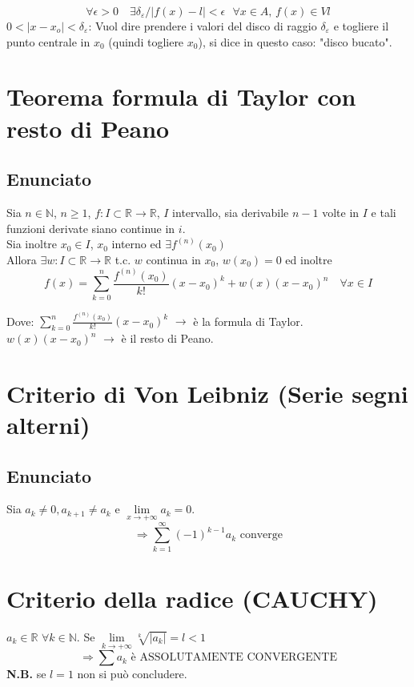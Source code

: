 \documentclass{article}
\newcommand{\R}{\mathbb{R}}
\newcommand{\N}{\mathbb{N}}
\newcommand{\DeltaEp}{\delta_{\varepsilon}} %
\newcommand{\hSpace}{\hspace{1em}}
\begin{document}
\begin{flushleft}
\[
\forall \epsilon > 0 \hSpace \exists \DeltaEp / \left|f(x)-l\right| < \epsilon \text{ } \forall x \in A \text{, } f(x) \in Vl
\]
$0 < \left|x - x_o\right| < \DeltaEp$: Vuol dire prendere i valori del disco di raggio $\DeltaEp$ e togliere il punto centrale in $x_0$ (quindi togliere $x_0$), si dice in questo caso: "disco bucato".

\section{Teorema formula di Taylor con resto di Peano}
\subsection{Enunciato}
Sia $n \in \N$, $n \geq 1$, $f:I \subset \R \rightarrow \R$, $I$ intervallo, sia derivabile $n-1$ volte in $I$ e tali funzioni derivate siano continue in $i$.\\
Sia inoltre $x_0 \in I$, $x_0$ interno ed $\exists f^{(n)}(x_0)$\\
Allora $\exists w: I \subset \R \rightarrow \R$ t.c. $w$ continua in $x_0$, $w(x_0)=0$ ed inoltre
\[
    f(x) = \sum_{k = 0}^{n} \frac{f^{(n)}(x_0)}{k!}(x - x_0 )^k + w(x)(x - x_0)^n \hSpace \forall x \in I
\]

Dove: $\sum_{k = 0}^{n} \frac{f^{(n)}(x_0)}{k!}(x - x_0 )^k$ \hSpace $\rightarrow$ \hSpace è la formula di Taylor.\\
\hspace*{2.55em} $w(x)(x - x_0)^n$ \hSpace $\rightarrow$ \hSpace è il resto di Peano.

\section{Criterio di Von Leibniz (Serie segni alterni)}
\subsection{Enunciato}
Sia $a_k \neq 0, a_{k+1} \neq a_k$ e $\lim\limits_{x \to + \infty}a_k = 0$.
\[
\Rightarrow \sum_{k = 1}^{\infty}(-1)^{k-1}a_k \text{ converge}
\]

\section{Criterio della radice (CAUCHY)}
$a_k \in \R $ $\forall k \in \N$. Se $\lim\limits_{k \to + \infty} \sqrt[k]{\left| a_k \right|} = l < 1$
\[
\Rightarrow \sum a_k \text{ è ASSOLUTAMENTE CONVERGENTE}
\]
\textbf{N.B.} se $l=1$ non si può concludere.


\end{flushleft}
\end{document}
